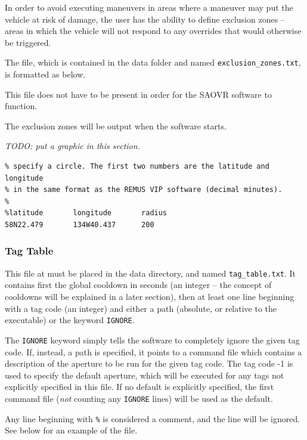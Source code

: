 \documentclass[11pt]{article} %
\begin{document}
In order to avoid executing maneuvers in areas where a maneuver may put
the vehicle at risk of damage, the user has the ability to define
exclusion zones -- areas in which the vehicle will not respond to
any overrides that would otherwise be triggered.

The file, which is contained in the data folder and named
\mbox{\texttt{exclusion\_zones.txt}}, is formatted as below.

This file does not have to be present in order for the SAOVR
software to function. 

The exclusion zones will be output when the software starts.

\emph{TODO: put a graphic in this section.}

\begin{Verbatim}[xleftmargin=.5in,fontsize=\small,frame=single]
% Each line in this file has three whitespace delimited entries which
% specify a circle. The first two numbers are the latitude and longitude
% in the same format as the REMUS VIP software (decimal minutes).
%
%latitude		longitude		radius
58N22.479		134W40.437		200
\end{Verbatim}

\subsubsection*{Tag Table}

This file at must be placed in the data directory, and named \mbox{\texttt{tag\_table.txt}}. It contains first the global cooldown in seconds (an integer -- the
concept of cooldowns will be explained in a later section),
then at least one line beginning with a tag code (an integer) and either a path (absolute, or relative to the executable) or
the keyword \mbox{\texttt{IGNORE}}. 

The \mbox{\texttt{IGNORE}} keyword simply tells the software to completely ignore the given tag code. If, instead, a path is specified, it points to a 
command file which contains a description of the aperture to be run for the given tag code.
The tag code -1 is used to specify the default aperture, which will be executed for any tags not explicitly specified in this file. 
If no default is explicitly specified, the first command file (\emph{not} counting any  \mbox{\texttt{IGNORE}} lines) will be used as the default.

Any line beginning with \texttt{\%} is considered a comment, and the line will be ignored. See below for an example of the file.
\end{document}
